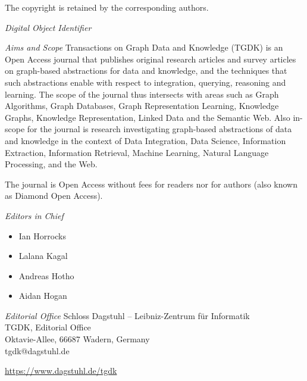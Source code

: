 \documentclass[a4paper,UKenglish]{tgdkmaster-v2021}
\begin{document}
\begin{publicationinfo}
The copyright is retained by the corresponding authors.

\vfill
\emph{Digital Object Identifier}\newline
\printIssueDOI

\newpage


\bigskip

\emph{Aims and Scope}\newline
Transactions on Graph Data and Knowledge (TGDK) is an Open Access journal that publishes original research articles and survey articles on graph-based abstractions for data and knowledge, and the techniques that such abstractions enable with respect to integration, querying, reasoning and learning. The scope of the journal thus intersects with areas such as Graph Algorithms, Graph Databases, Graph Representation Learning, Knowledge Graphs, Knowledge Representation, Linked Data and the Semantic Web. Also in-scope for the journal is research investigating graph-based abstractions of data and knowledge in the context of Data Integration, Data Science, Information Extraction, Information Retrieval, Machine Learning, Natural Language Processing, and the Web.

\medskip

The journal is Open Access without fees for readers nor for authors (also known as Diamond Open Access).	

\bigskip

\emph{Editors in Chief}
\begin{itemize}
\item Ian Horrocks %
\item Lalana Kagal %
\item Andreas Hotho %
\item Aidan Hogan %
\end{itemize}

\bigskip
\emph{Editorial Office}\newline
Schloss Dagstuhl -- Leibniz-Zentrum f\"ur Informatik\\
TGDK, Editorial Office\\
Oktavie-Allee, 66687 Wadern, Germany\\ 
tgdk@dagstuhl.de


\vfill

\url{https://www.dagstuhl.de/tgdk}
 
 \thispagestyle{empty}
 \onecolumn
\end{publicationinfo}
\end{document}
